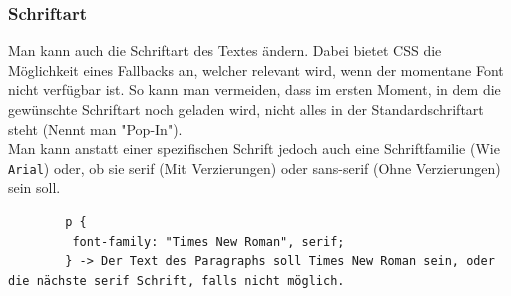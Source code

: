 \documentclass{article}
\begin{document}
		\subsubsection{Schriftart}
		Man kann auch die Schriftart des Textes ändern. Dabei bietet CSS die Möglichkeit eines Fallbacks an, welcher relevant wird, wenn der momentane Font nicht verfügbar ist. So kann man vermeiden, dass im ersten Moment, in dem die gewünschte Schriftart noch geladen wird, nicht alles in der Standardschriftart steht (Nennt man "Pop-In"). \\
		Man kann anstatt einer spezifischen Schrift jedoch auch eine Schriftfamilie (Wie \texttt{Arial}) oder, ob sie serif (Mit Verzierungen) oder sans-serif (Ohne Verzierungen) sein soll.
		\begin{verbatim}
		p {
		 font-family: "Times New Roman", serif;
		} -> Der Text des Paragraphs soll Times New Roman sein, oder die nächste serif Schrift, falls nicht möglich.
		\end{verbatim}
\end{document}
